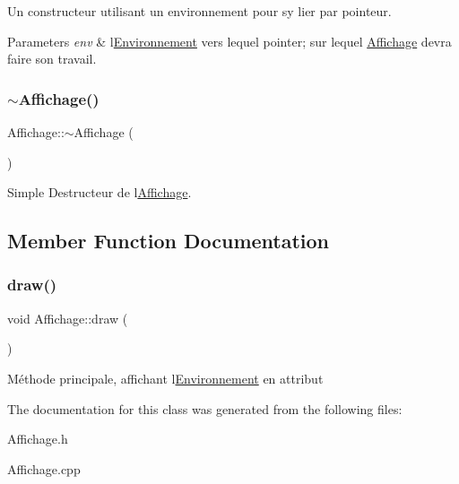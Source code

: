 Un constructeur utilisant un environnement pour s\textquotesingle{}y lier par pointeur. 
\begin{DoxyParams}{Parameters}
{\em env} & l\textquotesingle{}\mbox{\hyperlink{class_environnement}{Environnement}} vers lequel pointer; sur lequel \mbox{\hyperlink{class_affichage}{Affichage}} devra faire son travail. \\
\hline
\end{DoxyParams}
\mbox{\label{class_affichage_ae6a4f4db7a0d8d2abc8bd44c1be674c0}} 
\subsubsection{\texorpdfstring{$\sim$\+Affichage()}{~Affichage()}}
{\footnotesize\ttfamily Affichage\+::$\sim$\+Affichage (\begin{DoxyParamCaption}{ }\end{DoxyParamCaption})\hspace{0.3cm}{\ttfamily [virtual]}}

Simple Destructeur de l\textquotesingle{}\mbox{\hyperlink{class_affichage}{Affichage}}. 

\subsection{Member Function Documentation}
\mbox{\label{class_affichage_a7d0c9a0ff4f073097ec5e4c1b1b50d7a}} 
\subsubsection{\texorpdfstring{draw()}{draw()}}
{\footnotesize\ttfamily void Affichage\+::draw (\begin{DoxyParamCaption}{ }\end{DoxyParamCaption})}

Méthode principale, affichant l\textquotesingle{}\mbox{\hyperlink{class_environnement}{Environnement}} en attribut 

The documentation for this class was generated from the following files\+:\begin{DoxyCompactItemize}
\item 
Affichage.\+h\item 
Affichage.\+cpp\end{DoxyCompactItemize}
